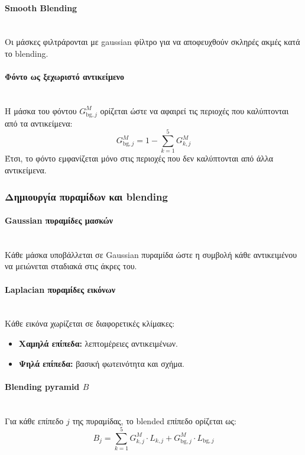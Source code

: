 \documentclass[12pt]{article}
\begin{document}
\paragraph{Smooth Blending}
\mbox{}\\
Οι μάσκες φιλτράρονται με gaussian φίλτρο για να αποφευχθούν σκληρές ακμές κατά το blending.

\paragraph{Φόντο ως ξεχωριστό αντικείμενο}
\mbox{}\\
Η μάσκα του φόντου $G_{\text{bg},j}^M$ ορίζεται ώστε να αφαιρεί τις περιοχές που καλύπτονται από τα αντικείμενα:
\[
G_{\text{bg},j}^M = 1 - \sum_{k=1}^{5} G_{k,j}^M
\]
Έτσι, το φόντο εμφανίζεται μόνο στις περιοχές που δεν καλύπτονται από άλλα αντικείμενα.

\subsubsection{Δημιουργία πυραμίδων και blending}
\paragraph{Gaussian πυραμίδες μασκών}
\mbox{}\\
Κάθε μάσκα υποβάλλεται σε Gaussian πυραμίδα ώστε η συμβολή κάθε αντικειμένου να μειώνεται σταδιακά στις άκρες του.

\paragraph{Laplacian πυραμίδες εικόνων}
\mbox{}\\
Κάθε εικόνα χωρίζεται σε διαφορετικές κλίμακες:
\begin{itemize}
    \item \textbf{Χαμηλά επίπεδα:} λεπτομέρειες αντικειμένων.
    \item \textbf{Ψηλά επίπεδα:} βασική φωτεινότητα και σχήμα.
\end{itemize}

\paragraph{Blending pyramid $B$}
\mbox{}\\
Για κάθε επίπεδο $j$ της πυραμίδας, το blended επίπεδο ορίζεται ως:
\[
B_j = \sum_{k=1}^{5} G^M_{k,j} \cdot L_{k,j} + G^M_{\text{bg},j} \cdot L_{\text{bg},j}
\]
\end{document}
